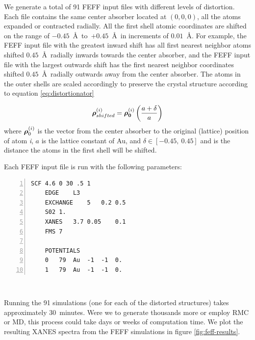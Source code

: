 We generate a total of 91 FEFF input files with different levels of distortion. Each file contains the same center absorber located at $ (0,0,0) $, all the atoms expanded or contracted radially. All the first shell atomic coordinates are shifted on the range of $ -0.45 $~\AA~to~$ +0.45 $~\AA~in increments of $ 0.01 $~\AA. For example, the FEFF input file with the greatest inward shift has all first nearest neighbor atoms shifted $ 0.45 $~\AA~radially inwards towards the center absorber, and the FEFF input file with the largest outwards shift has the first nearest neighbor coordinates shifted $ 0.45 $~\AA~radially outwards away from the center absorber. The atoms in the outer shells are scaled accordingly to preserve the crystal structure according to equation \ref{eq:distortionator}

\begin{equation}
	\label{eq:distortionator}
	\vb*{\rho}_{shifted}^{(i)} = \vb*{\rho_0}^{(i)} \left( \dfrac{a + \delta}{a} \right)
\end{equation}
where $ \vb*{\rho}_0^{(i)} $ is the vector from the center absorber to the original (lattice) position of atom \textit{i}, $ a $ is the lattice constant of Au, and $ \delta \in [-0.45,~0.45] $ and is the distance the atoms in the first shell will be shifted.   


\begin{minipage}{\linewidth}
Each FEFF input file is run with the following parameters: 
\begin{Verbatim}[samepage=true, numbers=left]
    SCF 4.6 0 30 .5 1
    EDGE    L3
    EXCHANGE    5   0.2 0.5
    S02 1.
    XANES   3.7 0.05    0.1
    FMS 7

    POTENTIALS
    0	79	Au	-1	-1	0.
    1	79	Au	-1	-1	0.
\end{Verbatim}
~
\end{minipage}

\noindent Running the 91 simulations (one for each of the distorted structures) takes approximately 30~minutes. Were we to generate thousands more or employ RMC or MD, this process could take days or weeks of computation time. We plot the resulting XANES spectra from the FEFF simulations in figure \ref{fig:feff-results}.


